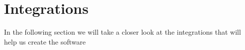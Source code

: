 \section{Integrations}\label{sec:integrations}

In the following section we will take a closer look at the integrations that will help us create the software
